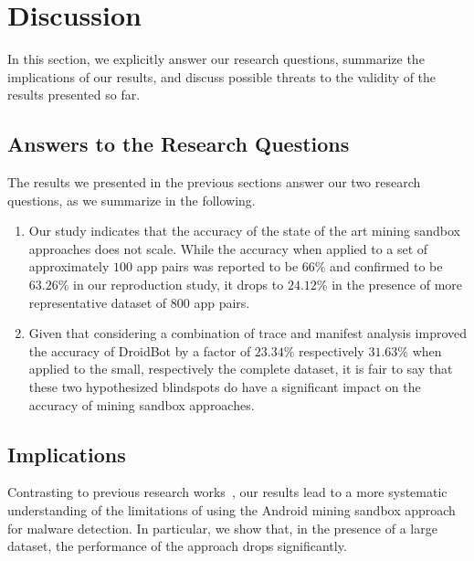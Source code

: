 \section{Discussion}

In this section, we explicitly answer our research questions,
summarize the implications of our results, and discuss possible
threats to the validity of the results presented so far.

\subsection{Answers to the Research Questions}

The results we presented in the previous sections
 answer our two research questions, as
we summarize in the following.

\begin{enumerate}[(RQ1)]
\item \textbf{\rqa} 
Our study indicates that the accuracy of the state of the art mining sandbox approaches does not scale.
While the accuracy when applied to a set of approximately $100$ app pairs
was reported to be $66\%$ and confirmed to be $63.26\%$ in our reproduction study, 
it drops to $24.12\%$ in the presence of more representative dataset of $800$ app pairs. 

 \item \textbf{\rqb} Given that considering a combination of trace and manifest analysis improved the accuracy of DroidBot by a factor of $23.34\%$ respectively $31.63\%$ when applied to the small, respectively the complete dataset, it is fair to say that these two hypothesized blindspots do have a significant impact on the accuracy of mining sandbox approaches. 
\end{enumerate}


\subsection{Implications}\label{sec:implications} 

Contrasting to previous research works~\cite{DBLP:conf/wcre/BaoLL18,DBLP:conf/iceccs/LeB0GL18,DBLP:journals/jss/CostaMMSSBNR22},
our results 
lead to a more systematic understanding
of the limitations of using the Android mining sandbox approach
for malware detection. In particular, we show that,
in the presence of a large dataset, the performance of the
approach drops significantly. 

